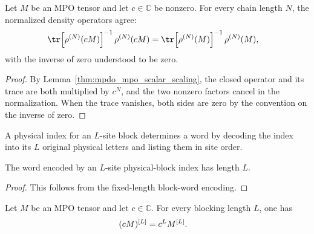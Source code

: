 \begin{lemma}
    \label{thm:mpdo_normalized_mpo_scaling_invariance}
    \leanok
    Let $M$ be an MPO tensor and let $c\in\mathbb C$ be nonzero. For every
    chain length $N$, the normalized density operators agree:
    \begin{align}
        \tr\!\left[\rho^{(N)}(cM)\right]^{-1}\rho^{(N)}(cM)
         & =\tr\!\left[\rho^{(N)}(M)\right]^{-1}\rho^{(N)}(M),
        \notag
    \end{align}
    with the inverse of zero understood to be zero.
\end{lemma}

\begin{proof}\leanok
    By Lemma~\ref{thm:mpdo_mpo_scalar_scaling}, the closed operator and its
    trace are both multiplied by $c^N$, and the two nonzero factors cancel in
    the normalization. When the trace vanishes, both sides are zero by the
    convention on the inverse of zero.
\end{proof}

\begin{definition}
    \label{def:mpdo_word_of_block}
    \leanok
    A physical index for an $L$-site block determines a word by decoding the
    index into its $L$ original physical letters and listing them in site order.
\end{definition}

\begin{lemma}
    \label{lem:mpdo_length_word_of_block}
    \leanok
    The word encoded by an $L$-site physical-block index has length $L$.
\end{lemma}

\begin{proof}\leanok
    This follows from the fixed-length block-word encoding.
\end{proof}

\begin{lemma}
    \label{thm:mpdo_block_tensor_scalar_scaling}
    \leanok
    Let $M$ be an MPO tensor and let $c\in\mathbb C$. For every blocking length
    $L$, one has
    \begin{align}
        (cM)^{[L]} & =c^L M^{[L]}.
        \notag
    \end{align}
\end{lemma}

